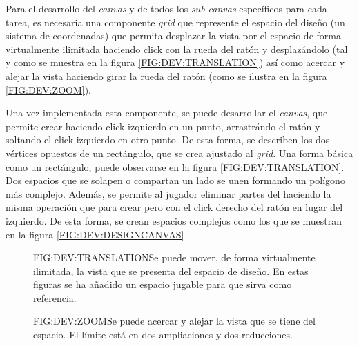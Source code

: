Para el desarrollo del \textit{canvas} y de todos los \textit{sub-canvas} específicos para cada tarea, es necesaria una componente \textit{grid} que represente el espacio del diseño (un sistema de coordenadas) que permita desplazar la vista por el espacio de forma virtualmente ilimitada haciendo click con la rueda del ratón y desplazándolo (tal y como se muestra en la figura \ref{FIG:DEV:TRANSLATION}) así como acercar y alejar la vista haciendo girar la rueda del ratón (como se ilustra en la figura \ref{FIG:DEV:ZOOM}).

Una vez implementada esta componente, se puede desarrollar el \textit{canvas}, que permite crear  haciendo click izquierdo en un punto, arrastrándo el ratón y soltando el click izquierdo en otro punto. De esta forma, se describen los dos vértices opuestos de un rectángulo, que se crea ajustado al \textit{grid}. Una forma básica como un rectángulo, puede observarse en la figura \ref{FIG:DEV:TRANSLATION}. Dos espacios que se solapen o compartan un lado se unen formando un polígono más complejo.
Además, se permite al jugador eliminar partes del  haciendo la misma operación que para crear pero con el click derecho del ratón en lugar del izquierdo.
De esta forma, se crean espacios complejos como los que se muestran en la figura \ref{FIG:DEV:DESIGNCANVAS}

\begin{figure}{FIG:DEV:TRANSLATION}{Se puede mover, de forma virtualmente ilimitada, la vista que se presenta del espacio de diseño. En estas figuras se ha añadido un espacio jugable para que sirva como referencia.}
	 \quad
\end{figure}

\begin{figure}{FIG:DEV:ZOOM}{Se puede acercar y alejar la vista que se tiene del espacio. El límite está en dos ampliaciones y dos reducciones.}
	 \quad
	 \quad
\end{figure}

